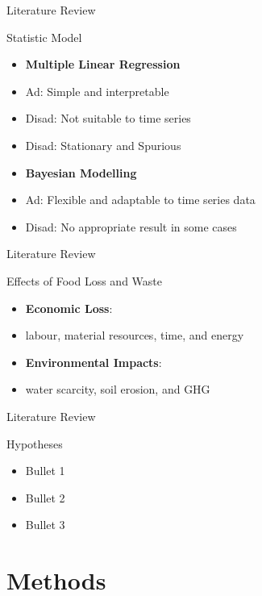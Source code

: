 \documentclass[
  ignorenonframetext,
]{beamer}
\providecommand{\tightlist}{%
  \setlength{\itemsep}{0pt}\setlength{\parskip}{0pt}}
\begin{document}
\begin{frame}{Literature Review}
\protect\hypertarget{literature-review-3}{}
\begin{block}{Statistic Model}
\protect\hypertarget{statistic-model}{}
\begin{itemize}
\item
  \textbf{Multiple Linear Regression}
\item
  Ad: Simple and interpretable
\item
  Disad: Not suitable to time series
\item
  Disad: Stationary and Spurious
\item
  \textbf{Bayesian Modelling}
\item
  Ad: Flexible and adaptable to time series data
\item
  Disad: No appropriate result in some cases
\end{itemize}
\end{block}
\end{frame}

\begin{frame}{Literature Review}
\protect\hypertarget{literature-review-4}{}
\begin{block}{Effects of Food Loss and Waste}
\protect\hypertarget{effects-of-food-loss-and-waste}{}
\begin{itemize}
\tightlist
\item
  \textbf{Economic Loss}:
\item
  labour, material resources, time, and energy
\item
  \textbf{Environmental Impacts}:
\item
  water scarcity, soil erosion, and GHG
\end{itemize}
\end{block}
\end{frame}

\begin{frame}{Literature Review}
\protect\hypertarget{literature-review-5}{}
\begin{block}{Hypotheses}
\protect\hypertarget{hypotheses}{}
\begin{itemize}
\tightlist
\item
  Bullet 1
\item
  Bullet 2
\item
  Bullet 3
\end{itemize}
\end{block}
\end{frame}

\hypertarget{methods}{%
\section{Methods}\label{methods}}
\end{document}
